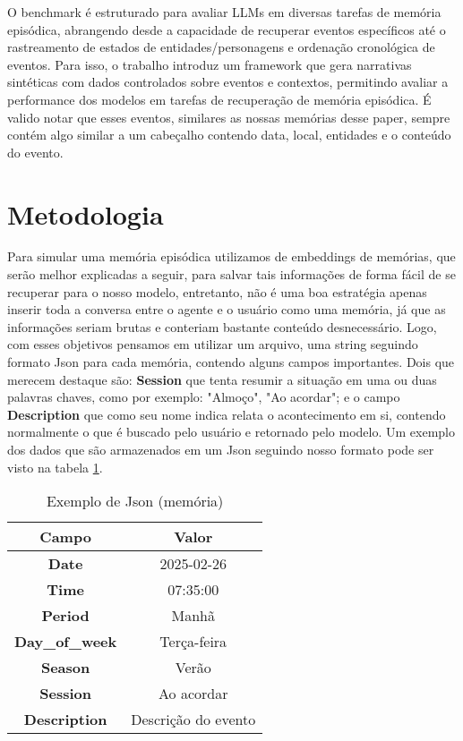 \documentclass[conference]{IEEEtran}
\begin{document}
O benchmark é estruturado para avaliar LLMs em diversas tarefas de memória episódica, abrangendo desde a capacidade de recuperar eventos específicos até o rastreamento de estados de entidades/personagens e ordenação cronológica de eventos. Para isso, o trabalho introduz um framework que gera narrativas sintéticas com dados controlados sobre eventos e contextos, permitindo avaliar a performance dos modelos em tarefas de recuperação de memória episódica.
É valido notar que esses eventos, similares as nossas memórias desse paper, sempre contém algo similar a um cabeçalho contendo data, local, entidades e o conteúdo do evento.

\section{Metodologia}
Para simular uma memória episódica utilizamos de embeddings de memórias, que serão melhor explicadas a seguir, para salvar tais informações de forma fácil de se recuperar para o nosso modelo, entretanto, não é uma boa estratégia apenas inserir toda a conversa entre o agente e o usuário como uma memória, já que as informações seriam brutas e conteriam bastante conteúdo desnecessário. Logo, com esses objetivos pensamos em utilizar um arquivo, uma string seguindo formato Json para cada memória, contendo alguns campos importantes. Dois que merecem destaque são: \textbf{Session} que tenta resumir a situação em uma ou duas palavras chaves, como por exemplo: "Almoço", "Ao acordar"; e o campo \textbf{Description} que como seu nome indica relata o acontecimento em si, contendo normalmente o que é buscado pelo usuário e retornado pelo modelo. Um exemplo dos dados que são armazenados em um Json seguindo nosso formato pode ser visto na tabela \ref{tab:Json}. 

\begin{table}[h]
    \centering
    \begin{tabular}{c|c}
    \textbf{Campo} & \textbf{Valor} \\ 
    \hline
    \textbf{Date} & 2025-02-26 \\ 
    \hline
    \textbf{Time} & 07:35:00 \\ 
    \hline
    \textbf{Period} & Manhã \\ 
    \hline
    \textbf{Day\_of\_week} & Terça-feira \\ 
    \hline
    \textbf{Season} & Verão \\ 
    \hline
    \textbf{Session} & Ao acordar \\ 
    \hline
    \textbf{Description} & Descrição do evento
    \end{tabular}
    \caption{Exemplo de Json (memória)}
    \label{tab:Json}
\end{table}
\end{document}
